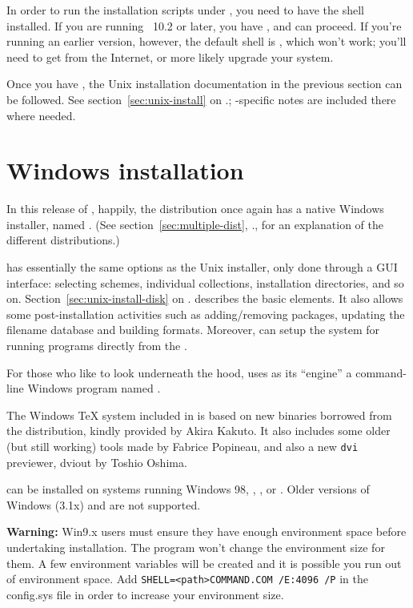 \documentclass{article}
\begin{document}
In order to run the installation scripts under \MacOSX, you need to have
the  shell installed.  If you are running \MacOSX~10.2
or later, you have , and can proceed.  If you're running
an earlier \MacOSX{} version, however, the default shell is
, which won't work; you'll need to get  from
the Internet, or more likely upgrade your system.

Once you have , the Unix installation documentation in the
previous section can be followed.  See section~\ref{sec:unix-install} on
\p.\pageref{sec:unix-install}; \MacOSX-specific notes are included there
where needed.

\section{Windows installation}
\label{sec:win-install}

In this release of \TL{}, happily, the distribution once
again has a native Windows installer, named .  (See
section~\ref{sec:multiple-dist}, \p.\pageref{sec:multiple-dist}, for an
explanation of the different distributions.)

 has essentially the same options as the Unix
installer, only done through a GUI interface: selecting schemes,
individual collections, installation directories, and so on.
Section~\ref{sec:unix-install-disk} on
\p.\pageref{sec:unix-install-disk} describes the basic elements.  It
also allows some post-installation activities such as adding/removing
packages, updating the filename database and building formats.
Moreover,  can setup the system for running
programs directly from the \DVD.

For those who like to look underneath the hood,  uses
as its ``engine'' a command-line Windows program named .

The Windows \TeX{} system included in \TL{} is based on new binaries 
borrowed from the  distribution, kindly provided by Akira Kakuto.
It also includes some older (but still working) tools made by Fabrice
Popineau, and also a new \texttt{dvi} previewer, \textsf{dviout} by
Toshio Oshima. 

\TL{} can be installed on systems running Windows 98, ,
,  or .  Older versions of Windows (3.1x)
and  are not supported.

\textbf{Warning:} Win9.x users must ensure they have enough environment
  space before undertaking installation. The 
  program won't change the environment size for them. A few environment
  variables will be created and it is possible you run out of
  environment space. Add \texttt{SHELL=<path>COMMAND.COM /E:4096 /P} in the
  config.sys file in order to increase your environment size.
\end{document}
